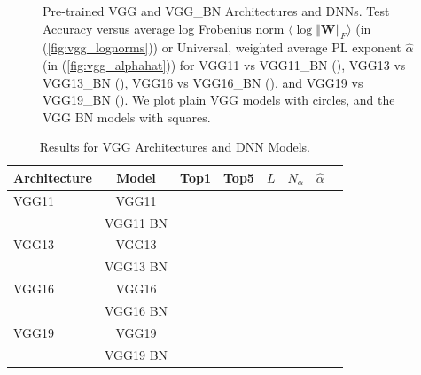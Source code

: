 \begin{figure}[t]
{      \label{fig:vgg_alphahat}
   }
   \caption{%
      Pre-trained VGG and VGG\_BN Architectures and DNNs.  
      Test Accuracy versus
      average log Frobenius norm $\langle\log\Vert\mathbf{W}\Vert_{F}\rangle$ (in (\ref{fig:vgg_lognorms}))
      or
      Universal, weighted average PL exponent $\hat{\alpha}$ (in (\ref{fig:vgg_alphahat}))
      for
      VGG11 vs VGG11\_BN ({\color{blue}{blue}}),
      VGG13 vs VGG13\_BN ({\color{orange}{orange}}),
      VGG16 vs VGG16\_BN ({\color{green}{green}}),  and
      VGG19 vs VGG19\_BN ({\color{red}{red}}). 
      We plot plain VGG models with circles, and the VGG BN models with squares.
   }
   \label{fig:vgg}
\end{figure}





\begin{table}[t]
\small
\begin{center}
\begin{tabular}{|p{0.75in}|c|c|c|c|c|c|c|}
\hline
Architecture 
 & Model &Top1 
 & Top5 & $L$ & $N_{\alpha}$ & $\hat{\alpha}$ \\
\hline
VGG11 & VGG11 & & & & & \\
  & VGG11 BN & & & & & \\
\hline
VGG13 & VGG13 & & & & & \\
  & VGG13 BN & & & & & \\
\hline
VGG16 & VGG16 & & & & & \\
  & VGG16 BN & & & & & \\
\hline
VGG19 & VGG19 & & & & & \\
  & VGG19 BN & & & & & \\
\hline
\end{tabular}
\end{center}
\caption{Results for VGG Architectures and DNN Models.}
\label{table:models_VGG}
\end{table}


